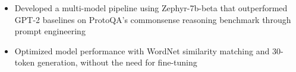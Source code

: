 \begin{itemize}
  \item Developed a multi-model pipeline using Zephyr-7b-beta that outperformed GPT-2 baselines on ProtoQA's commonsense reasoning benchmark through prompt engineering
  \item Optimized model performance with WordNet similarity matching and 30-token generation, without the need for fine-tuning
\end{itemize}